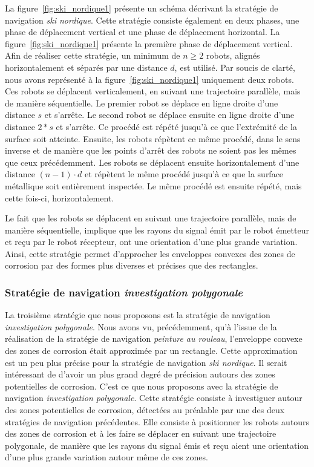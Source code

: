 \documentclass[francais,RandD]{rapportPFE}
\begin{document}
				La figure~\ref{fig:ski_nordique1} présente un schéma décrivant la stratégie de navigation \textit{ski nordique}.
				Cette stratégie consiste également en deux phases, une phase de déplacement vertical et une phase de déplacement horizontal.
				La figure~\ref{fig:ski_nordique1} présente la première phase de déplacement vertical.
				Afin de réaliser cette stratégie, un minimum de $n \ge 2$ robots, alignés horizontalement et séparés par une distance $d$, est utilisé.
				Par soucis de clarté, nous avons représenté à la figure~\ref{fig:ski_nordique1} uniquement deux robots.
				Ces robots se déplacent verticalement, en suivant une trajectoire parallèle, mais de manière séquentielle.
				Le premier robot se déplace en ligne droite d'une distance $s$ et s'arrête.
				Le second robot se déplace ensuite en ligne droite d'une distance $2 * s$ et s'arrête.
				Ce procédé est répété jusqu'à ce que l'extrémité de la surface soit atteinte.
				Ensuite, les robots répètent ce même procédé, dans le sens inverse et de manière que les points d'arrêt des robots ne soient pas les mêmes que ceux précédemment.
				Les robots se déplacent ensuite horizontalement d'une distance $(n - 1) \cdot d$ et répètent le même procédé jusqu'à ce que la surface métallique soit entièrement inspectée.
				Le même procédé est ensuite répété, mais cette fois-ci, horizontalement.

				Le fait que les robots se déplacent en suivant une trajectoire parallèle, mais de manière séquentielle, implique que les rayons du signal émit par le robot émetteur et reçu par le robot récepteur, ont une orientation d'une plus grande variation.
				Ainsi, cette stratégie permet d'approcher les enveloppes convexes des zones de corrosion par des formes plus diverses et précises que des rectangles.
			\subsubsection*{Stratégie de navigation \textit{investigation polygonale}}
				La troisième stratégie que nous proposons est la stratégie de navigation \textit{investigation polygonale}.
				Nous avons vu,  précédemment, qu'à l'issue de la réalisation de la stratégie de navigation \textit{peinture au rouleau}, l'enveloppe convexe des zones de corrosion était approximée par un rectangle.
				Cette approximation est un peu plus précise pour la stratégie de navigation \textit{ski nordique}.
				Il serait intéressant de d'avoir un plus grand degré de précision autours des zones potentielles de corrosion.
				C'est ce que nous proposons avec la stratégie de navigation \textit{investigation polygonale}.
				Cette stratégie consiste à investiguer autour des zones potentielles de corrosion, détectées au préalable par une des deux stratégies de navigation précédentes.
				Elle consiste à positionner les robots autours des zones de corrosion et à les faire se déplacer en suivant une trajectoire polygonale, de manière que les rayons du signal émis et reçu aient une orientation d'une plus grande variation autour même de ces zones.
\end{document}
